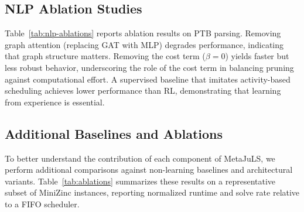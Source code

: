 \documentclass[11pt]{article}
\begin{document}
\subsection{NLP Ablation Studies}

Table~\ref{tab:nlp-ablations} reports ablation results on PTB parsing. Removing graph attention (replacing GAT with MLP) degrades performance, indicating that graph structure matters. Removing the cost term ($\beta=0$) yields faster but less robust behavior, underscoring the role of the cost term in balancing pruning against computational effort. A supervised baseline that imitates activity-based scheduling achieves lower performance than RL, demonstrating that learning from experience is essential.

\begin{table}[t]
  \centering
  \small
  \caption{Ablation results on PTB parsing. Mean $\pm$ std over 5 runs.}
  \label{tab:nlp-ablations}
\end{table}

\subsection{Additional Baselines and Ablations}

To better understand the contribution of each component of MetaJuLS, we perform additional comparisons against non-learning baselines and architectural variants. Table~\ref{tab:ablations} summarizes these results on a representative subset of MiniZinc instances, reporting normalized runtime and solve rate relative to a FIFO scheduler.
\end{document}
